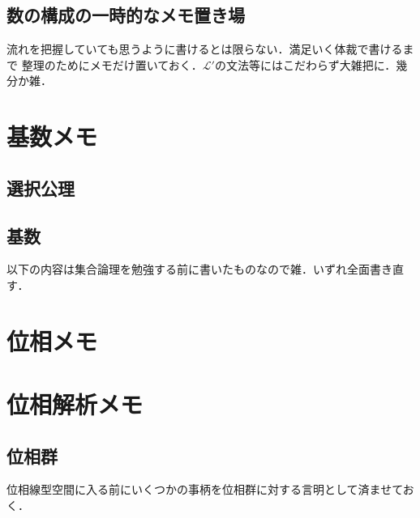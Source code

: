 \documentclass[a4j,10.5pt,oneside,openany]{jsbook}
\theoremstyle{mystyle}
\begin{document}
	\section{数の構成の一時的なメモ置き場}
		流れを把握していても思うように書けるとは限らない．満足いく体裁で書けるまで
		整理のためにメモだけ置いておく．$\mathcal{L}'$の文法等にはこだわらず大雑把に．幾分か雑．
		
		
		
	
	
	
	
	
	
	
	
	
\chapter{基数メモ}
	\section{選択公理}
		
	\section{基数}
		
		

\newpage	
以下の内容は集合論理を勉強する前に書いたものなので雑．いずれ全面書き直す．
\chapter{位相メモ}
	
	
	
	
	
	
	
	
	

\chapter{位相解析メモ}
	\section{位相群}
		位相線型空間に入る前にいくつかの事柄を位相群に対する言明として済ませておく．
		
		
		
\end{document}
